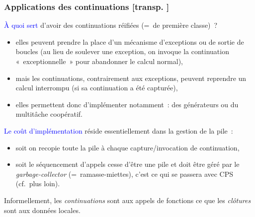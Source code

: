 \documentclass[mathserif,a4paper,aspectratio=169]{beamer}
\renewcommand{\frametitle}[1]{\subsubsection*{#1 {\footnotesize[transp. \insertframenumber]}}}
\begin{document}
\begin{frame}
\frametitle{Applications des continuations}

\textcolor{blue}{À quoi sert} d'avoir des continuations réifiées (= de
première classe) ?
\begin{itemize}
\item elles peuvent prendre la place d'un mécanisme
  d'\alert{exceptions} ou de sortie de boucles (au lieu de soulever
  une exception, on invoque la continuation « exceptionnelle » pour
  abandonner le calcul normal),
\item mais les continuations, contrairement aux exceptions, peuvent
  \alert{reprendre} un calcul interrompu (si sa continuation a été
  capturée),
\item elles permettent donc d'implémenter notamment : des générateurs
  ou du multitâche coopératif.
\end{itemize}

\bigskip

\textcolor{blue}{Le coût d'implémentation} réside essentiellement dans
la gestion de la pile :
\begin{itemize}
\item soit on recopie toute la pile à chaque
  capture/invocation de continuation,
\item soit le séquencement d'appels cesse d'être une pile et doit être
  géré par le \textit{garbage-collector} (= ramasse-miettes), c'est ce
  qui se passera avec CPS (cf. plus loin).
\end{itemize}

\medskip

Informellement, les \emph{continuations} sont aux appels de fonctions
ce que les \emph{clôtures} sont aux données locales.

\end{frame}
%
\end{document}
